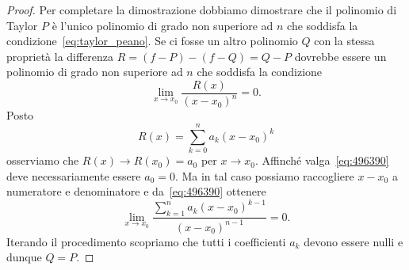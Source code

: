 \begin{proof}
Per completare la dimostrazione dobbiamo dimostrare che il polinomio di 
Taylor $P$ è l'unico polinomio di grado non superiore ad $n$ che soddisfa 
la condizione~\eqref{eq:taylor_peano}.
Se ci fosse un altro polinomio $Q$ con la stessa proprietà la differenza 
$R=(f-P)-(f-Q)=Q-P$ dovrebbe essere un polinomio di grado 
non superiore ad $n$ che soddisfa la condizione 
\begin{equation}\label{eq:496390}
  \lim_{x\to x_0}\frac{R(x)}{(x-x_0)^n}=0.  
\end{equation}
Posto 
\[
  R(x) = \sum_{k=0}^n a_k (x-x_0)^k  
\]
osserviamo che $R(x)\to R(x_0) = a_0$ per $x\to x_0$. 
Affinché valga~\eqref{eq:496390} deve necessariamente 
essere $a_0 = 0$.
Ma in tal caso possiamo raccogliere $x-x_0$ a numeratore 
e denominatore e da~\eqref{eq:496390} ottenere 
\[
  \lim_{x\to x_0}\frac{\sum_{k=1}^n a_k (x-x_0)^{k-1}}{(x-x_0)^{n-1}}=0.  
\]
Iterando il procedimento scopriamo che tutti i coefficienti $a_k$ 
devono essere nulli e dunque $Q=P$.
\end{proof}

